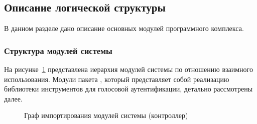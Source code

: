 \subsection{Описание логической структуры}

В данном разделе дано описание основных модулей программного комплекса.

\subsubsection*{Структура модулей системы}



На рисунке~\ref{fig:import_graph} представлена иерархия модулей системы по
отношению взаимного использования. Модули
пакета , который представляет собой реализацию библиотеки
инструментов для голосовой аутентификации, детально рассмотрены далее.

\begin{figure}[ht!]
\center{\scalebox{0.77}{}}
\caption{Граф импортирования модулей системы (контроллер)}
\label{fig:import_graph}
\end{figure}


